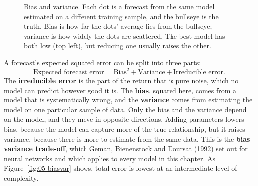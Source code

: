 \begin{figure}[htbp]
  \centering
  \caption{Bias and variance. Each dot is a forecast from the same model
    estimated on a different training sample, and the bullseye is the truth.
    Bias is how far the dots' average lies from the bullseye; variance is how
    widely the dots are scattered. The best model has both low (top left), but
    reducing one usually raises the other.}
  \label{fig:21-targets}
\end{figure}

A forecast's expected squared error can be split into three parts:
\begin{equation}
  \text{Expected forecast error} = \text{Bias}^2 + \text{Variance} + \text{Irreducible error}.
  \label{eq:21-biasvar}
\end{equation}
The \textbf{irreducible error} is the part of the return that is pure noise, which no model can predict however good it is. The \textbf{bias}, squared here, comes from a model that is systematically wrong, and the \textbf{variance} comes from estimating the model on one particular sample of data. Only the bias and the variance depend on the model, and they move in opposite directions. Adding parameters lowers bias, because the model can capture more of the true relationship, but it raises variance, because there is more to estimate from the same data. This is the \textbf{bias--variance trade-off}, which Geman, Bienenstock and Doursat (1992) set out for neural networks and which applies to every model in this chapter. As Figure~\ref{fig:05-biasvar} shows, total error is lowest at an intermediate level of complexity.


